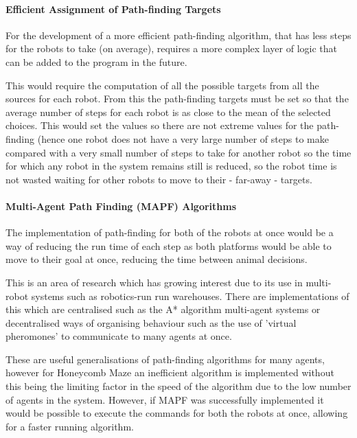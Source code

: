 \paragraph{Efficient Assignment of Path-finding Targets}

For the development of a more efficient path-finding algorithm, that has less steps for the robots to take (on average), requires a more complex layer of logic that can be added to the program in the future.

This would require the computation of all the possible targets from all the sources for each robot. From this the path-finding targets must be set so that the average number of steps for each robot is as close to the mean of the selected choices. This would set the values so there are not extreme values for the path-finding (hence one robot does not have a very large number of steps to make compared with a very small number of steps to take for another robot so the time for which any robot in the system remains still is reduced, so the robot time is not wasted waiting for other robots to move to their - far-away - targets.

\paragraph{Multi-Agent Path Finding (MAPF) Algorithms } 

The implementation of path-finding for both of the robots at once would be a way of reducing the run time of each step as both platforms would be able to move to their goal at once, reducing the time between animal decisions.

This is an area of research which has growing interest due to its use in multi-robot systems such as robotics-run run warehouses. There are implementations of this which are centralised such as the A* algorithm multi-agent systems \cite{DBLP:journals/corr/abs-2103-09979} or decentralised ways of organising behaviour such as the use of 'virtual pheromones' \cite{multi_agent_pathfinding_review} to communicate to many agents at once. 


These are useful generalisations of path-finding algorithms for many agents, however for Honeycomb Maze an inefficient algorithm is implemented without this being the limiting factor in the speed of the algorithm due to the low number of agents in the system.
However, if MAPF was successfully implemented it would be possible to execute the commands for both the robots at once, allowing for a faster running algorithm.











